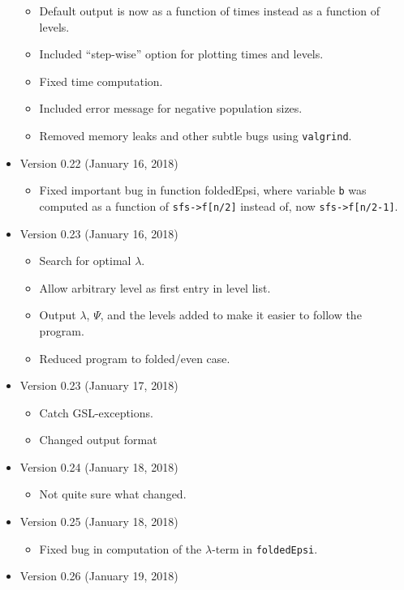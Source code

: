 \documentclass[a4paper]{article}
\newcommand{\ty}{\texttt}
\begin{document}
\begin{itemize}
\begin{itemize}
    \item Default output is now as a function of times instead as a
      function of levels.
    \item Included ``step-wise'' option for plotting times and levels.
    \item Fixed time computation.
    \item Included error message for negative population sizes.
    \item Removed memory leaks and other subtle bugs using \ty{valgrind}.
  \end{itemize}
\item Version 0.22 (January 16, 2018)
  \begin{itemize}
    \item Fixed important bug in function foldedEpsi, where variable
      \ty{b} was computed as a function of \verb+sfs->f[n/2]+ instead
      of, now \verb+sfs->f[n/2-1]+.
  \end{itemize}
\item Version 0.23 (January 16, 2018)
  \begin{itemize}
  \item Search for optimal $\lambda$.
  \item Allow arbitrary level as first entry in level list.
  \item Output $\lambda$, $\Psi$, and the levels added to make it
    easier to follow the program.
  \item Reduced program to folded/even case.
  \end{itemize}
\item Version 0.23 (January 17, 2018)
  \begin{itemize}
  \item Catch GSL-exceptions.
  \item Changed output format
  \end{itemize}
\item Version 0.24 (January 18, 2018)
  \begin{itemize}
  \item Not quite sure what changed.
  \end{itemize}
\item Version 0.25 (January 18, 2018)
  \begin{itemize}
  \item Fixed bug in computation of the $\lambda$-term in
    \ty{foldedEpsi}.
  \end{itemize}
\item Version 0.26 (January 19, 2018)
  \begin{itemize}

\end{itemize}
\end{itemize}
\end{document}
